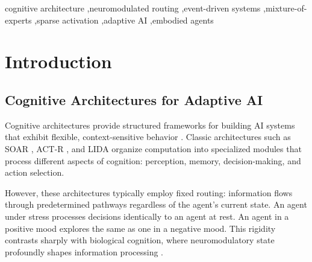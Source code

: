 \documentclass[preprint,12pt]{elsarticle}
\begin{document}
\begin{frontmatter}
\begin{abstract}
We demonstrate behavioral capabilities through scenarios spanning stress response, pharmacological intervention, and social cognition: D2 receptor blockade produces inverted-U therapeutic curves \textit{consistent with} clinical pharmacology patterns; stress induces persistent anhedonia through a PFC-dopamine cascade \textit{matching observed trajectories}; and prolonged captivity triggers fight-to-fawn defensive transitions \textit{consistent with} trauma psychology literature. These behaviors emerge from architecture dynamics without explicit programming, demonstrating qualitative consistency rather than validated predictions.

Simulacrum provides a framework for building adaptive AI agents with state-dependent behavior, applicable to interactive virtual agents, game AI, and autonomous systems requiring nuanced emotional and cognitive responses.
\end{abstract}

\begin{keyword}
cognitive architecture \sep neuromodulated routing \sep event-driven systems \sep mixture-of-experts \sep sparse activation \sep adaptive AI \sep embodied agents
\end{keyword}

\end{frontmatter}


\section{Introduction}

\subsection{Cognitive Architectures for Adaptive AI}

Cognitive architectures provide structured frameworks for building AI systems that exhibit flexible, context-sensitive behavior \cite{laird2012,anderson2004}. Classic architectures such as SOAR \cite{laird2012}, ACT-R \cite{anderson2004}, and LIDA \cite{franklin2018} organize computation into specialized modules that process different aspects of cognition: perception, memory, decision-making, and action selection.

However, these architectures typically employ fixed routing: information flows through predetermined pathways regardless of the agent's current state. An agent under stress processes decisions identically to an agent at rest. An agent in a positive mood explores the same as one in a negative mood. This rigidity contrasts sharply with biological cognition, where neuromodulatory state profoundly shapes information processing \cite{schultz2007,arnsten2009}.
\end{document}
